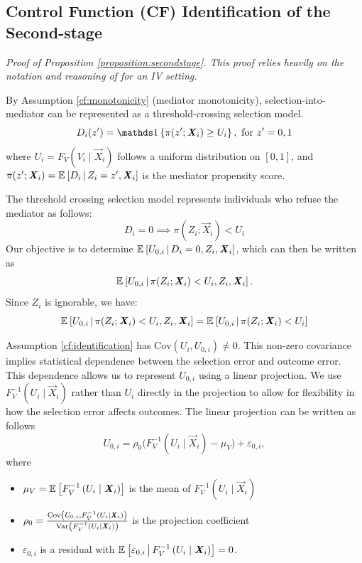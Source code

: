 \subsection{Control Function (CF) Identification of the Second-stage}
\label{appendix:cf-secondstage}
\textit{Proof of Proposition \ref{proposition:secondstage}.
    This proof relies heavily on the notation and reasoning of \cite{kline2019heckits} for an IV setting.}

By Assumption \ref{cf:monotonicity} (mediator monotonicity), selection-into-mediator can be represented as a threshold-crossing selection model.
\[ D_i(z') = \indicator{ \pi(z'; \vec X_i) \geq U_i }, \text{ for } z' = 0, 1 \]
where $U_i = F_V\left( V_i \mid \vec{X}_i \right)$ follows a uniform distribution on $[0,1]$, and $\pi(z'; \boldsymbol{\mathit{X}}_i) = \mathbb{E}_{} \left[ D_i \, \middle\vert \, Z_i = z', \boldsymbol{\mathit{X}}_i \right]$ is the mediator propensity score.

The threshold crossing selection model represents individuals who refuse the mediator as follows:
\[ D_i = 0 \implies \pi(Z_i; \vec X_i) < U_i \]
Our objective is to determine $\mathbb{E}_{} \left[ U_{0,i} \, \middle\vert \, D_i=0, Z_i, \boldsymbol{\mathit{X}}_i \right]$, which can then be written as
\[ \mathbb{E}_{} \left[ U_{0,i} \, \middle\vert \, \pi(Z_i; \boldsymbol{\mathit{X}}_i) < U_i, Z_i, \boldsymbol{\mathit{X}}_i \right]. \]
Since $Z_i$ is ignorable, we have:
\[ \mathbb{E}_{} \left[ U_{0,i} \, \middle\vert \, \pi(Z_i; \boldsymbol{\mathit{X}}_i) < U_i, Z_i, \boldsymbol{\mathit{X}}_i \right]
    = \mathbb{E}_{} \left[ U_{0,i} \, \middle\vert \, \pi(Z_i; \boldsymbol{\mathit{X}}_i) < U_i \right] \]

Assumption \ref{cf:identification} has $\text{Cov}(U_i, U_{0,i}) \neq 0$.
This non-zero covariance implies statistical dependence between the selection error and outcome error.
This dependence allows us to represent $U_{0,i}$ using a linear projection.
We use $F_V^{-1}\left( U_i \mid \vec{X}_i \right)$ rather than $U_i$ directly in the projection to allow for flexibility in how the selection error affects outcomes.
The linear projection can be written as follows
\[ U_{0,i} = \rho_0 \big( F_V^{-1}\left( U_i \mid \vec{X}_i \right) - \mu_V \big) + \varepsilon_{0,i}, \]
where
\begin{itemize}
    \item $\mu_V = \mathbb{E}_{} \left[ F_V^{-1}\left( U_i \mid \boldsymbol{\mathit{X}}_i \right) \right]$ is the mean of $F_V^{-1}\left( U_i \mid \vec{X}_i \right)$
    \item $\rho_0 = \frac{\text{Cov} \left( U_{0,i}, F_V^{-1}\left( U_i \mid \boldsymbol{\mathit{X}}_i \right) \right)}{\text{Var}_{} \left( F_V^{-1}\left( U_i \mid \boldsymbol{\mathit{X}}_i \right) \right)}$ is the projection coefficient
    \item $\varepsilon_{0,i}$ is a residual with $\mathbb{E}_{} \left[ \varepsilon_{0,i} \, \middle\vert \, F_V^{-1}\left( U_i \mid \boldsymbol{\mathit{X}}_i \right) \right] = 0$.
\end{itemize}

